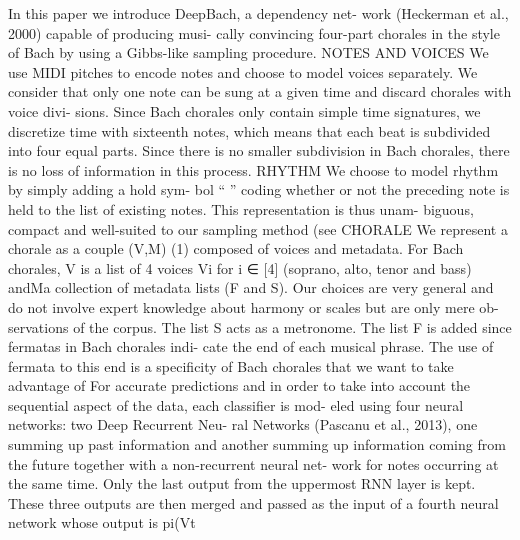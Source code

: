\cite{Hadjeres2016} In this paper we introduce DeepBach, a dependency net- work (Heckerman et al., 2000) capable of producing musi- cally convincing four-part chorales in the style of Bach by using a Gibbs-like sampling procedure. NOTES AND VOICES We use MIDI pitches to encode notes and choose to model voices separately. We consider that only one note can be sung at a given time and discard chorales with voice divi- sions. Since Bach chorales only contain simple time signatures, we discretize time with sixteenth notes, which means that each beat is subdivided into four equal parts. Since there is no smaller subdivision in Bach chorales, there is no loss of information in this process. RHYTHM We choose to model rhythm by simply adding a hold sym- bol “ ” coding whether or not the preceding note is held to the list of existing notes. This representation is thus unam- biguous, compact and well-suited to our sampling method (see
CHORALE We represent a chorale as a couple (V,M) (1) composed of voices and metadata. For Bach chorales, V is a list of 4 voices Vi for i ∈ [4] (soprano, alto, tenor and bass) andMa collection of metadata lists (F and S). Our choices are very general and do not involve expert knowledge about harmony or scales but are only mere ob-
servations of the corpus. The list S acts as a metronome. The list F is added since fermatas in Bach chorales indi- cate the end of each musical phrase. The use of fermata to this end is a specificity of Bach chorales that we want to take advantage of
For accurate predictions and in order to take into account the sequential aspect of the data, each classifier is mod- eled using four neural networks: two Deep Recurrent Neu- ral Networks (Pascanu et al., 2013), one summing up past information and another summing up information coming from the future together with a non-recurrent neural net- work for notes occurring at the same time. Only the last output from the uppermost RNN layer is kept. These three outputs are then merged and passed as the input of a fourth neural network whose output is pi(Vt
